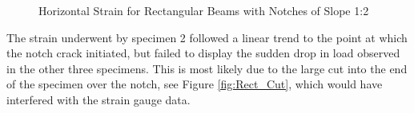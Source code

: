 \documentclass[11pt,a4paper]{article}
\numberwithin{equation}{subsection}
\begin{document}
\begin{figure}[h]
	\begin{center}
	\end{center}
	\caption{Horizontal Strain for Rectangular Beams with Notches of Slope 1:2}
	\label{fig:Rect_12_Z}
\end{figure}
\pagebreak

\noindent
The strain underwent by specimen 2 followed a linear trend to the point at which the notch crack initiated, but failed to display the sudden drop in load observed in the other three specimens. This is most likely due to the large cut into the end of the specimen over the notch, see Figure \ref{fig:Rect_Cut}, which would have interfered with the strain gauge data. 

\vspace*{\baselineskip}
\end{document}
